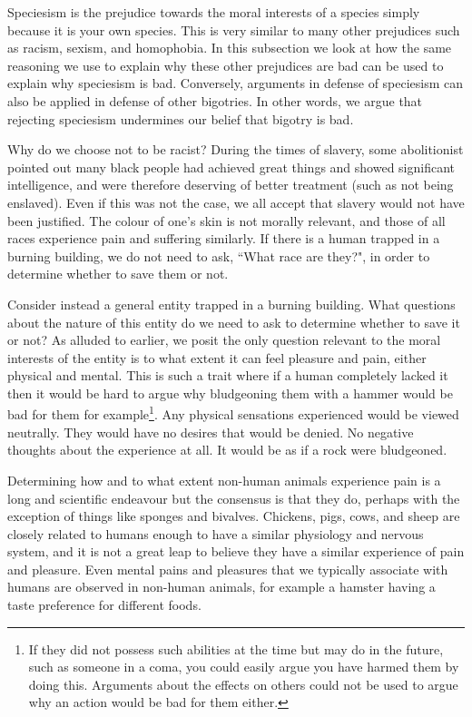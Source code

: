 Speciesism is the prejudice towards the moral interests of a species simply because it is your own species. This is very similar to many other prejudices such as racism, sexism, and homophobia. In this subsection we look at how the same reasoning we use to explain why these other prejudices are bad can be used to explain why speciesism is bad. Conversely, arguments in defense of speciesism can also be applied in defense of other bigotries. In other words, we argue that rejecting speciesism undermines our belief that bigotry is bad.

Why do we choose not to be racist? During the times of slavery, some abolitionist pointed out many black people had achieved great things and showed significant intelligence, and were therefore deserving of better treatment (such as not being enslaved). Even if this was not the case, we all accept that slavery would not have been justified. The colour of one's skin is not morally relevant, and those of all races experience pain and suffering similarly. If there is a human trapped in a burning building, we do not need to ask, ``What race are they?", in order to determine whether to save them or not.

Consider instead a general entity trapped in a burning building. What questions about the nature of this entity do we need to ask to determine whether to save it or not? As alluded to earlier, we posit the only question relevant to the moral interests of the entity is to what extent it can feel pleasure and pain, either physical and mental. This is such a trait where if a human completely lacked it then it would be hard to argue why bludgeoning them with a hammer would be bad for them for example\footnote{If they did not possess such abilities at the time but may do in the future, such as someone in a coma, you could easily argue you have harmed them by doing this. Arguments about the effects on others could not be used to argue why an action would be bad for them either.}. Any physical sensations experienced would be viewed neutrally. They would have no desires that would be denied. No negative thoughts about the experience at all. It would be as if a rock were bludgeoned.

Determining how and to what extent non-human animals experience pain is a long and scientific endeavour but the consensus is that they do, perhaps with the exception of things like sponges and bivalves. Chickens, pigs, cows, and sheep are closely related to humans enough to have a similar physiology and nervous system, and it is not a great leap to believe they have a similar experience of pain and pleasure. Even mental pains and pleasures that we typically associate with humans are observed in non-human animals, for example a hamster having a taste preference for different foods.

